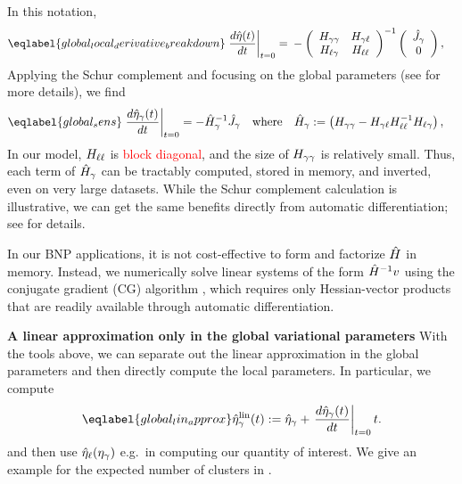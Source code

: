 In this notation,
%
\begin{align} \eqlabel{global_local_derivative_breakdown}
%
\fracat{d \etaopt(\t)}{d \t}{t = 0} ={}&
-\left(
\begin{array}{cc}
   \hess{\gamma\gamma} & \hess{\gamma\ell} \\
   \hess{\ell\gamma}     & \hess{\ell\ell} \\
\end{array}
\right)^{-1}
\left( \begin{array}{c} \crosshessian_\gamma \\ 0 \end{array}\right),
%
\end{align}
%
Applying the Schur complement and focusing on the global parameters (see  for more details), we find
%
\begin{align}\eqlabel{global_sens}
  \fracat{d \etaopt_\gamma(\t)}{d \t}{t = 0} &=
  - \hessopt_\gamma^{-1}\crosshessian_\gamma
  \mathwhere
  \hessopt_\gamma := \left(\hess{\gamma\gamma} -
        \hess{\gamma\ell} \hess{\ell\ell}^{-1} \hess{\ell\gamma}\right),
\end{align}
%
In our model, $H_{\ell\ell}$ is \textcolor{red}{block diagonal}, and the size of $H_{\gamma\gamma}$
is relatively small. Thus, each term of $\hat{H}_\gamma$ can be tractably
computed, stored in memory, and inverted, even on very large datasets.
While the Schur complement calculation is illustrative, we can get the same benefits directly from automatic differentiation; see  for details.

In our BNP applications, it is not cost-effective to form and factorize
$\hat{H}$ in memory.  Instead, we numerically solve linear systems of the form
$\hat{H}^{-1} v$ using the conjugate gradient (CG) algorithm \citep[Chapter
5]{nocedal:2006:numerical}, which requires only Hessian-vector products that
are readily available through automatic differentiation. 

\noindent \textbf{A linear approximation only in the global variational parameters}
%
With the tools above, we can separate out the linear approximation in the global parameters
and then directly compute the local parameters. In particular,
we compute
%
\begin{align}\eqlabel{global_lin_approx}
  \etalin_\gamma(\t) := \etaopt_\gamma +
  \fracat{d \etaopt_\gamma(\t)}{d \t}{\t=0} \t .
\end{align}
%
and then use $\hat\eta_{\ell}(\eta_{\gamma})$ e.g.\ in computing our quantity of interest.
We give an example for the expected number of clusters in .